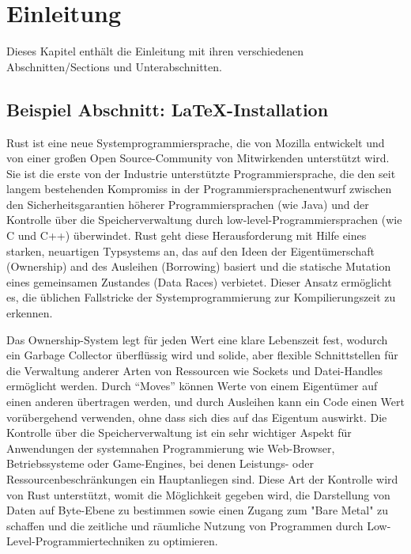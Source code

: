 \chapter{Einleitung}

\nocite{*}

Dieses Kapitel enthält die Einleitung mit ihren verschiedenen Abschnitten/Sections und Unterabschnitten.

\section{Beispiel Abschnitt: \LaTeX-Installation}

Rust ist eine neue Systemprogrammiersprache, die von Mozilla entwickelt und von einer großen Open Source-Community von Mitwirkenden unterstützt wird. Sie ist die erste von der Industrie unterstützte Programmiersprache, die den seit langem bestehenden Kompromiss in der Programmiersprachenentwurf zwischen den Sicherheitsgarantien höherer Programmiersprachen (wie Java) und der Kontrolle über die Speicherverwaltung durch low-level-Programmiersprachen (wie C und C++) überwindet. Rust geht diese Herausforderung mit Hilfe eines starken, neuartigen Typsystems an, das auf den Ideen der Eigentümerschaft (Ownership) and des Ausleihen (Borrowing) basiert und die statische Mutation eines gemeinsamen Zustandes (Data Races) verbietet. Dieser Ansatz ermöglicht es, die üblichen Fallstricke der Systemprogrammierung zur Kompilierungszeit zu erkennen. 

Das Ownership-System legt für jeden Wert eine klare Lebenszeit fest, wodurch ein Garbage Collector überflüssig wird und solide, aber flexible Schnittstellen für die Verwaltung anderer Arten von Ressourcen wie Sockets und Datei-Handles ermöglicht werden. Durch “Moves” können Werte von einem Eigentümer auf einen anderen übertragen werden, und durch Ausleihen kann ein Code einen Wert vorübergehend verwenden, ohne dass sich dies auf das Eigentum auswirkt. 
Die Kontrolle über die Speicherverwaltung ist ein sehr wichtiger Aspekt für Anwendungen der systemnahen Programmierung wie Web-Browser, Betriebssysteme oder Game-Engines, bei denen Leistungs- oder Ressourcenbeschränkungen ein Hauptanliegen sind. Diese Art der Kontrolle wird von Rust unterstützt, womit die Möglichkeit gegeben wird, die Darstellung von Daten auf Byte-Ebene zu bestimmen sowie einen Zugang zum "Bare Metal" zu schaffen und die zeitliche und räumliche Nutzung von Programmen durch Low-Level-Programmiertechniken zu optimieren.

